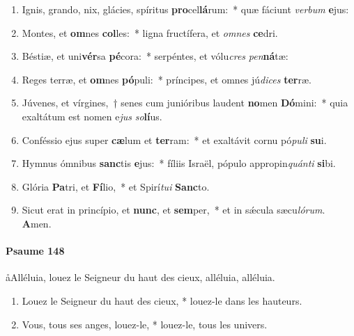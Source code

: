 \documentclass[twoside]{article}
\begin{document}
\begin{paracol}[1]{2}
\begin{enumerate}[wide, itemsep=0mm, labelwidth=!, labelindent=0pt, label=\color{gregoriocolor}\theenumi]
\item Ignis, grando, nix, glácies, spíritus \textbf{pro}cel\textbf{lá}rum:~* quæ fáciunt \textit{ver}\textit{bum} \textbf{e}jus:

\item Montes, et \textbf{om}nes \textbf{col}les:~* ligna fructífera, et \textit{om}\textit{nes} \textbf{ce}dri.

\item Béstiæ, et uni\textbf{vér}sa \textbf{pé}cora:~* serpéntes, et vólu\textit{cres} \textit{pen}\textbf{ná}tæ:

\item Reges terræ, et \textbf{om}nes \textbf{pó}puli:~* príncipes, et omnes jú\textit{di}\textit{ces} \textbf{ter}ræ.

\item Júvenes, et vírgines,~† senes cum junióribus laudent \textbf{no}men \textbf{Dó}mini:~* quia exaltátum est nomen e\textit{jus} \textit{so}\textbf{lí}us.

\item Conféssio ejus super \textbf{cæ}lum et \textbf{ter}ram:~* et exaltávit cornu pó\textit{pu}\textit{li} \textbf{su}i.

\item Hymnus ómnibus \textbf{sanc}tis \textbf{e}jus:~* fíliis Israël, pópulo appropin\textit{quán}\textit{ti} \textbf{si}bi.

\item Glória \textbf{Pa}tri, et \textbf{Fí}lio,~* et Spirí\textit{tu}\textit{i} \textbf{Sanc}to.

\item Sicut erat in princípio, et \textbf{nunc}, et \textbf{sem}per,~* et in sǽcula sæcu\textit{ló}\textit{rum}. \textbf{A}men.
\end{enumerate}

\switchcolumn

\paragraph{Psaume 148}
\aa Alléluia, louez le Seigneur du haut des cieux, alléluia, alléluia.


\begin{enumerate}[wide, itemsep=0mm, labelwidth=!, labelindent=0pt, label=\color{gregoriocolor}\theenumi]
\item Louez le Seigneur du haut des cieux, *
louez-le dans les hauteurs.

\item Vous, tous ses anges, louez-le, *
louez-le, tous les univers.


\end{enumerate}
\end{paracol}
\end{document}
